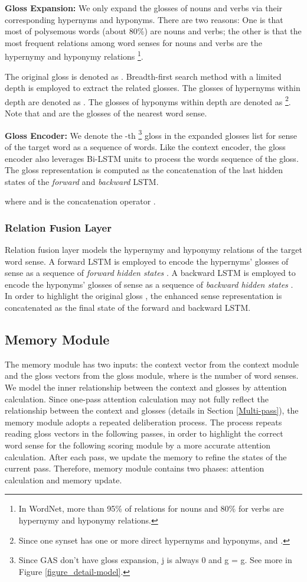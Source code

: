 \documentclass[11pt,a4paper]{article}
\begin{document}
\textbf{Gloss Expansion:}
We only expand the glosses of nouns and verbs via their corresponding hypernyms and hyponyms.
There are two reasons: One is that most of polysemous words (about 80\%) are nouns and verbs;
the other is that the most frequent relations among word senses for nouns and verbs are the hypernymy and hyponymy relations \footnote{In WordNet, more than 95\% of relations for nouns and 80\% for verbs are hypernymy and hyponymy relations.}.


The original gloss is denoted as .
Breadth-first search method with a limited depth  is employed to extract the related glosses.
The glosses of hypernyms within  depth are denoted as .
The glosses of hyponyms within  depth are denoted as 
\footnote{Since one synset has one or more direct hypernyms and hyponyms,  and .}.
Note that  and  are the glosses of the nearest word sense.


\textbf{Gloss Encoder:}
We denote the -th \footnote{Since GAS don't have gloss expansion, j is always 0 and g = g. See more in Figure \ref{figure_detail-model}.} gloss in the expanded glosses list for  sense of the target word as a sequence of  words.
Like the context encoder, the gloss encoder also leverages Bi-LSTM units to process the words sequence of the gloss.
The gloss representation  is computed as the concatenation of the last hidden states of the { \em forward} and {\em backward} LSTM.

where  and  is the concatenation operator .


\subsubsection{Relation Fusion Layer}
Relation fusion layer models the hypernymy and hyponymy relations of the target word sense.
A forward LSTM is employed to encode the hypernyms' glosses of  sense  as a sequence of {\em forward hidden states}  .
A backward LSTM is employed to encode the hyponyms' glosses of  sense  as a sequence of {\em backward hidden states} .
In order to highlight the original gloss , the enhanced  sense representation is concatenated as the final state of the forward and backward LSTM.


\subsection{Memory Module} \label{subsec:MemoryModule}
The memory module has two inputs: the context vector  from the context module and the gloss vectors  from the gloss module, where  is the number of word senses.
We model the inner relationship between the context and glosses by attention calculation.
Since one-pass attention calculation may not fully reflect the relationship between the context and glosses (details in Section \ref{Multi-pass}), the memory module adopts a repeated deliberation process.
The process repeats reading gloss vectors in the following passes,
in order to highlight the correct word sense for the following scoring module by a more accurate attention calculation.
After each pass, we update the memory to refine the states of the current pass.
Therefore, memory module contains two phases: attention calculation and memory update.
\end{document}
